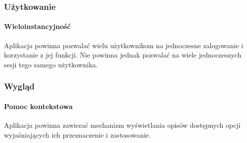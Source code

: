 \subsubsection{Użytkowanie}

\paragraph{Wieloinstancyjność\newline}
Aplikacja powinna pozwalać wielu użytkownikom na jednoczesne zalogowanie i korzystanie z jej funkcji. Nie powinna jednak pozwalać na wiele jednoczesnych sesji tego samego użytkownika.

\subsubsection{Wygląd}

\paragraph{Pomoc kontekstowa\newline}
Aplikacja powinna zawierać mechanizm wyświetlania opisów dostępnych opcji wyjaśniających ich przeznaczenie i zastosowanie.
